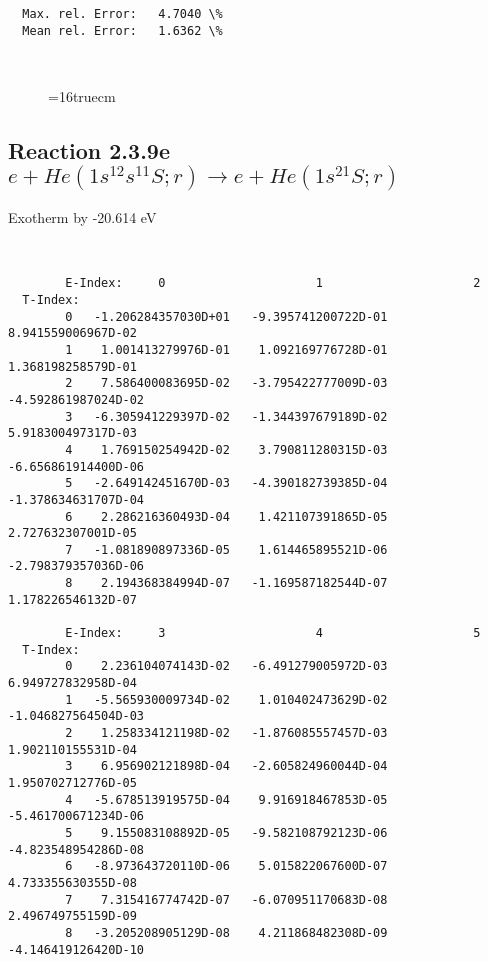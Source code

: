\documentclass[12pt,dvipdfmx]{article}
\begin{document}
{\begin{small}
\begin{verbatim}
  Max. rel. Error:   4.7040 \%
  Mean rel. Error:   1.6362 \%



\end{verbatim}\end{small}
\begin{figure} \label{2.3.9d}
\epsfxsize=16truecm
\end{figure}
\newpage


\subsection{
Reaction 2.3.9e  $e + He(1s^12s^11S;r) \rightarrow e + He(1s^21S;r) $
}
Exotherm by -20.614 eV

\begin{small}\begin{verbatim}


        E-Index:     0                     1                     2
  T-Index:
        0   -1.206284357030D+01   -9.395741200722D-01    8.941559006967D-02
        1    1.001413279976D-01    1.092169776728D-01    1.368198258579D-01
        2    7.586400083695D-02   -3.795422777009D-03   -4.592861987024D-02
        3   -6.305941229397D-02   -1.344397679189D-02    5.918300497317D-03
        4    1.769150254942D-02    3.790811280315D-03   -6.656861914400D-06
        5   -2.649142451670D-03   -4.390182739385D-04   -1.378634631707D-04
        6    2.286216360493D-04    1.421107391865D-05    2.727632307001D-05
        7   -1.081890897336D-05    1.614465895521D-06   -2.798379357036D-06
        8    2.194368384994D-07   -1.169587182544D-07    1.178226546132D-07

        E-Index:     3                     4                     5
  T-Index:
        0    2.236104074143D-02   -6.491279005972D-03    6.949727832958D-04
        1   -5.565930009734D-02    1.010402473629D-02   -1.046827564504D-03
        2    1.258334121198D-02   -1.876085557457D-03    1.902110155531D-04
        3    6.956902121898D-04   -2.605824960044D-04    1.950702712776D-05
        4   -5.678513919575D-04    9.916918467853D-05   -5.461700671234D-06
        5    9.155083108892D-05   -9.582108792123D-06   -4.823548954286D-08
        6   -8.973643720110D-06    5.015822067600D-07    4.733355630355D-08
        7    7.315416774742D-07   -6.070951170683D-08    2.496749755159D-09
        8   -3.205208905129D-08    4.211868482308D-09   -4.146419126420D-10


\end{verbatim}
\end{small}}
\end{document}
